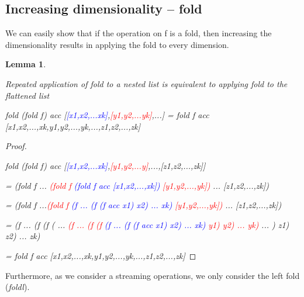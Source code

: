 \documentclass{article}
\newtheorem{lemma}{Lemma}
\begin{document}
\subsection{Increasing dimensionality -- fold}

We can easily show that if the operation on f is a fold, then increasing
the dimensionality results in applying the fold to every dimension. 

\begin{lemma}\label{FoldOnNestedList}

Repeated application of \emph{fold} to a nested list is equivalent
to applying \emph{fold} to the flattened list

\emph{fold (fold f) acc {[}}\textcolor{blue}{\emph{{[}x1,x2,...xk{]}}}\emph{,}\textcolor{red}{\emph{{[}y1,y2,...yk{]}}}\emph{,...{]}
= fold f acc {[}x1,x2,...,xk,y1,y2,...,yk,...,z1,z2,...,zk{]}}

\end{lemma}

\begin{proof}

~

\emph{fold (fold f) acc {[}}\textcolor{blue}{\emph{{[}x1,x2,...xk{]}}}\emph{,}\textcolor{red}{\emph{{[}y1,y2,...y{]}}}\emph{,...,{[}z1,z2,...,zk{]}{]} }

\emph{= (fold f ... }\textcolor{red}{\emph{(fold f}}\emph{ }\textcolor{blue}{\emph{(fold
f acc {[}x1,x2,...,xk{]})}}\emph{ }\textcolor{red}{\emph{{[}y1,y2,...,yk{]})}}\emph{
... {[}z1,z2,...,zk{]})}

\emph{= (fold f ...}\textcolor{red}{\emph{(fold f}}\emph{ }\textcolor{blue}{\emph{(f
... (f (f acc x1) x2) ... xk) }}\textcolor{red}{\emph{{[}y1,y2,...,yk{]})}}\emph{
... {[}z1,z2,...,zk{]})}

\emph{= (f ... (f (f ( ... }\textcolor{red}{\emph{(f ... (f (f}}\emph{
}\textcolor{blue}{\emph{(f ... (f (f acc x1) x2) ... xk)}}\emph{ }\textcolor{red}{\emph{y1)
y2) ... yk)}}\emph{ ... ) z1) z2) ... zk)}

\emph{= fold f acc {[}x1,x2,...,xk,y1,y2,...,yk,...,z1,z2,...,zk{]}}

\end{proof}

Furthermore, as we consider a streaming operations, we only consider
the left fold (\emph{foldl}). 
\end{document}
